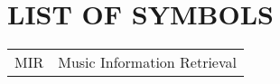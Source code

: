 \newpage
\section*{\fontsize{14pt}{0pt}\bfseries LIST OF SYMBOLS}
\begin{longtable}[l]{p{50pt} p{200pt}}
    MIR & Music Information Retrieval  \\
\end{longtable}

